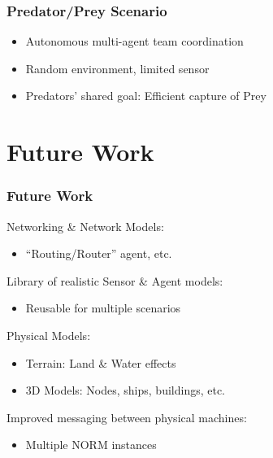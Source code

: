\documentclass[mathserif,usenames,dvipsnames]{beamer}
\begin{document}
\frame
{
    \frametitle{Predator/Prey Scenario}
    \begin{itemize}
        \item Autonomous multi-agent team coordination
        \item Random environment, limited sensor
        \item Predators' shared goal: Efficient capture of Prey
    \end{itemize}
}

\section{Future Work}
\frame
{
    \frametitle{Future Work}
    Networking \& Network Models:
    \begin{itemize}
        \item ``Routing/Router'' agent, etc.
    \end{itemize}
    Library of realistic Sensor \& Agent models:
    \begin{itemize}
        \item Reusable for multiple scenarios 
    \end{itemize}
    Physical Models:
    \begin{itemize}
        \item Terrain: Land \& Water effects 
        \item 3D Models: Nodes, ships, buildings, etc.
    \end{itemize}
    Improved messaging between physical machines:
    \begin{itemize}
        \item Multiple NORM instances
    \end{itemize}
}
\end{document}
